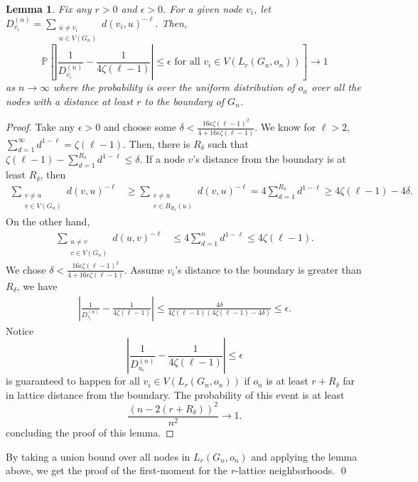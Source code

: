 \documentclass[10pt]{amsart}
\newtheorem{lemma}[theorem]{Lemma}
\begin{document}
\begin{lemma} Fix any $r > 0$ and $\epsilon > 0$. For a given node $v_i$, let $D_{v_i}^{(n)}=\sum_{\substack{u\neq v_i \\ u \in V(G_n)}} d(v_i,u)^{-\ell}$.
Then, 
$$\mathbb{P}\left[\left|\frac{1}{D_{v_i}^{(n)}} - \frac{1}{4\zeta(\ell-1)}\right| \leq \epsilon \text{ for all } v_i \in V(L_r(G_n, o_n))\right] \to 1$$
as $n \to \infty$ where the probability is over the uniform distribution of $o_n$ over all the nodes with a distance at least $r$ to the boundary of $G_n$.
\end{lemma}
\begin{proof}
    Take any $\epsilon > 0 $ and choose some $\delta < \frac{16\epsilon \zeta(\ell-1)^2}{4 + 16 \epsilon  \zeta(\ell-1)}$. We know  for $\ell > 2$, $\sum_{d=1}^\infty d^{1-\ell}=\zeta(\ell-1)$. Then, there is $R_\delta$ such that $\zeta(\ell-1)-\sum_{d=1}^{R_\delta} d^{1-\ell} \leq \delta.$ If a node $v$'s distance from the boundary is at least $R_\delta$, then 
    \begin{align*}
    \sum_{\substack{v\neq u \\ v \in V(G_n)}} d(v, u)^{-\ell}&\geq \sum_{\substack{v\neq u \\ v\in B_{R_\delta}(u)}} d(v, u)^{-\ell} = 4\sum_{d=1}^{ R_\delta} d^{1-\ell}\geq 4\zeta(\ell-1)-4\delta.
    \end{align*}
    On the other hand,
    \begin{align*}
    \sum_{\substack{u\neq v \\ v \in V(G_n)}} d(u,v)^{-\ell}&\leq 4\sum_{d=1}^n d^{1-\ell}  \leq 4\zeta(\ell-1).
    \end{align*}
    We chose $\delta < \frac{16\epsilon \zeta(\ell-1)^2}{4 + 16 \epsilon  \zeta(\ell-1)}$. Assume $v_i$'s distance to the boundary is greater than $R_\delta$, we have
    \begin{align*}
        \left|\frac{1}{D_{v_i}^{(n)}} -\frac{1}{4\zeta(\ell-1)}\right| \leq \frac{4\delta}{4\zeta(\ell-1)(4\zeta(\ell-1) -4\delta)} \leq \epsilon.
    \end{align*}
    Notice $$\left|\frac{1}{D_{u_i}^{(n)}} - \frac{1}{4\zeta(\ell-1)}\right| \leq \epsilon$$ is guaranteed to happen for all  $v_i \in V(L_r(G_n, o_n))$ if $o_n$ is at least $r+R_\delta$ far in lattice distance from the boundary. The probability of this event is  at least $$\frac{(n-2(r+R_\delta))^2}{n^2} \to 1.$$
    concluding the proof of this lemma.
\end{proof}
By taking a union bound over all nodes in $L_r(G_n,o_n)$ and applying the lemma above, we get the proof of the first-moment for the $r$-lattice neighborhoods. \qed
\end{document}
